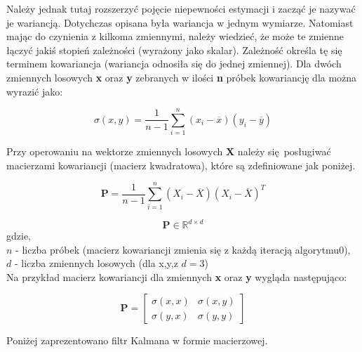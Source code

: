 {{{        Należy jednak tutaj rozszerzyć pojęcie niepewności estymacji i zacząć je nazywać je wariancją. Dotychczas opisana była wariancja w jednym wymiarze. Natomiast mając do czynienia z kilkoma
        zmiennymi, należy wiedzieć, że może te zmienne łączyć jakiś stopień zależności (wyrażony jako skalar). Zależność określa tę się terminem kowariancja \cite{covariance} (wariancja odnosiła się do jednej zmiennej).
        Dla dwóch zmiennych losowych \textbf{x} oraz \textbf{y} zebranych w ilości \textbf{n} próbek kowariancję dla można wyrazić jako:

        \begin{equation}
            \sigma(x,y) = \frac{1}{n-1} \sum^n_{i=1} (x_i - \overline{x})(y_i - \overline{y})
        \end{equation}

        Przy operowaniu na wektorze zmiennych losowych \textbf{X} należy się posługiwać macierzami kowariancji (macierz kwadratowa), które są zdefiniowane jak poniżej.

        \begin{equation}
            \bm{P} = \frac{1}{n-1} \sum^n_{i=1} (X_i - \overline{X})(X_i - \overline{X})^T
        \end{equation}

        \begin{equation}
            \bm{P} \in \mathbb{R}^{d \times d}
        \end{equation}
        gdzie,\\
        $n$ - liczba próbek (macierz kowariancji zmienia się z każdą iteracją algorytmu0),\\
        $d$ - liczba zmiennych losowych (dla x,y,z $d=3$)\\

        Na przykład macierz kowariancji dla zmiennych \textbf{x} oraz \textbf{y} wygląda następująco:

        \begin{equation}
            \bm{P} = 
            \begin{bmatrix}
            \sigma(x,x) & \sigma(x,y) \\
            \sigma(y,x) & \sigma(y,y)
            \end{bmatrix}
        \end{equation}    

        Poniżej zaprezentowano filtr Kalmana w formie macierzowej.

}}}
